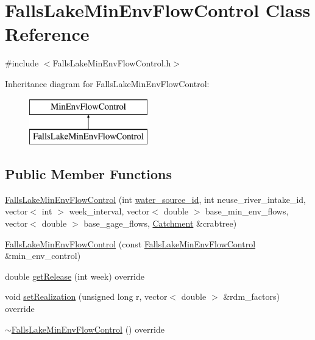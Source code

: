 \hypertarget{classFallsLakeMinEnvFlowControl}{}\section{Falls\+Lake\+Min\+Env\+Flow\+Control Class Reference}
\label{classFallsLakeMinEnvFlowControl}


{\ttfamily \#include $<$Falls\+Lake\+Min\+Env\+Flow\+Control.\+h$>$}

Inheritance diagram for Falls\+Lake\+Min\+Env\+Flow\+Control\+:\begin{figure}[H]
\begin{center}
\leavevmode
\includegraphics[height=2.000000cm]{classFallsLakeMinEnvFlowControl}
\end{center}
\end{figure}
\subsection*{Public Member Functions}
\begin{DoxyCompactItemize}
\item 
\mbox{\hyperlink{classFallsLakeMinEnvFlowControl_a9cef248e2fd8a194c92454a79398a6a6}{Falls\+Lake\+Min\+Env\+Flow\+Control}} (int \mbox{\hyperlink{classMinEnvFlowControl_aada518a047598f386daec1d0358023aa}{water\+\_\+source\+\_\+id}}, int neuse\+\_\+river\+\_\+intake\+\_\+id, vector$<$ int $>$ week\+\_\+interval, vector$<$ double $>$ base\+\_\+min\+\_\+env\+\_\+flows, vector$<$ double $>$ base\+\_\+gage\+\_\+flows, \mbox{\hyperlink{classCatchment}{Catchment}} \&crabtree)
\item 
\mbox{\hyperlink{classFallsLakeMinEnvFlowControl_a0ac46bcd8bea2e6e56824b5398129418}{Falls\+Lake\+Min\+Env\+Flow\+Control}} (const \mbox{\hyperlink{classFallsLakeMinEnvFlowControl}{Falls\+Lake\+Min\+Env\+Flow\+Control}} \&min\+\_\+env\+\_\+control)
\item 
double \mbox{\hyperlink{classFallsLakeMinEnvFlowControl_a50453b443fb6e5869fcfc9a183f42b2f}{get\+Release}} (int week) override
\item 
void \mbox{\hyperlink{classFallsLakeMinEnvFlowControl_a6ea8a5e9ff9179066cceb77d896f3f97}{set\+Realization}} (unsigned long r, vector$<$ double $>$ \&rdm\+\_\+factors) override
\item 
\mbox{\hyperlink{classFallsLakeMinEnvFlowControl_a747aefedd1e590007206ef08145be351}{$\sim$\+Falls\+Lake\+Min\+Env\+Flow\+Control}} () override
\end{DoxyCompactItemize}
